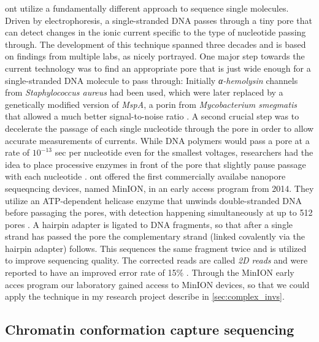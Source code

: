 \Acl{ont} utilize a fundamentally different approach to sequence single
molecules. Driven by electrophoresis, a single-stranded DNA passes through a
tiny pore that can detect changes in the ionic current specific to the type of
nucleotide passing through. The development of this technique spanned three
decades and is based on findings from multiple labs, as \cite{Deamer2016}
nicely portrayed. One major step towards the current technology was to find an
appropriate pore that is just wide enough for a single-stranded DNA molecule to
pass through: Initially \textit{α-hemolysin} channels from
\textit{Staphylococcus aureus} had been used, which were later replaced by a
genetically modified version of \textit{MspA}, a porin from
\textit{Mycobacterium smegmatis} that allowed a much better signal-to-noise
ratio \citep{Butler2008}. A second crucial step was to decelerate the passage of
each single nucleotide through the pore in order to allow accurate measurements
of currents. While DNA polymers would pass a pore at a rate of $10^{-13}$ sec
per nucleotide even for the smallest voltages, researchers had the idea to place
processive enzymes in front of the pore that slightly pause passage with each
nucleotide \citep{Deamer2016}. \Ac{ont} offered the first commercially availabe
nanopore sequeqncing devices, named MinION, in an early access program from 2014.
They utilize an ATP-dependent helicase enzyme that unwinds double-stranded DNA
before passaging the pores, with detection happening simultaneously at up to
512 pores \citep{Jain2015}. A hairpin adapter is ligated to DNA fragments, so
that after a single strand has passed the pore the complementary strand
(linked covalently via the hairpin adapter) follows. This sequences the same
fragment twice and is utilized to improve sequencing quality. The corrected reads
are called \emph{2D reads} and were reported to have an improved error rate of
15\% \citep{Jain2015}. Through the MinION early acces program our laboratory
gained access to MinION devices, so that we could apply the technique in my
research project describe in \cref{sec:complex_invs}.






\subsection{Chromatin conformation capture sequencing}
\label{sec:ccc}

